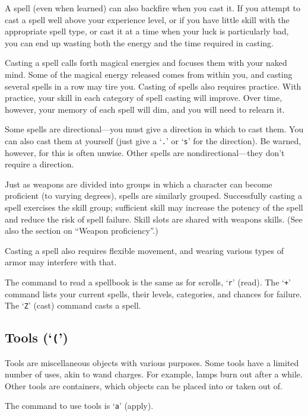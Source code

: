 A spell (even when learned) can also backfire when you cast it.  If you
attempt to cast a spell well above your experience level, or if you have
little skill with the appropriate spell type, or cast it at
a time when your luck is particularly bad, you can end up wasting both the
energy and the time required in casting.

Casting a spell calls forth magical energies and focuses them with
your naked mind.  Some of the magical energy released comes from within
you, and casting several spells in a row may tire you.
Casting of spells also requires practice.  With practice, your
skill in each category of spell casting will improve.  Over time, however,
your memory of each spell will dim, and you will need to relearn it.

Some spells are
directional---you must give a direction in which to cast them.  You can also
cast them at yourself (just give a `{\tt .}' or `{\tt s}' for the direction).
Be warned, however, for this is often unwise.  Other spells are
nondirectional---they don't require a direction.

Just as weapons are divided into groups in which a character can become
proficient (to varying degrees), spells are similarly grouped.
Successfully casting a spell exercises the skill group; sufficient skill
may increase the potency of the spell and reduce the risk of spell failure.
Skill slots are shared with weapons skills.  (See also the section on
``Weapon proficiency''.)

Casting a spell also requires flexible movement, and wearing various types
of armor may interfere with that.

The command to read a spellbook is the same as for scrolls, `{\tt r}'
(read).  The `{\tt +}' command lists your current spells, their levels,
categories, and chances for failure.
The `{\tt Z}' (cast) command casts a spell.

\subsection*{Tools (`{\tt (}')}

Tools are miscellaneous objects with various purposes.  Some tools
have a limited number of uses, akin to wand charges.  For example, lamps burn
out after a while.  Other tools are containers, which objects can
be placed into or taken out of.

The command to use tools is `{\tt a}' (apply).

